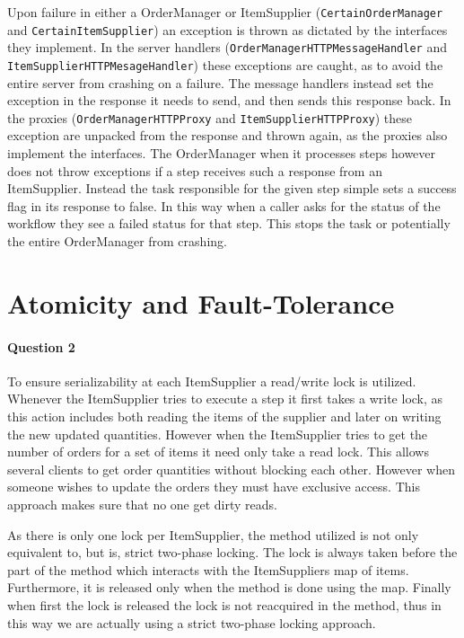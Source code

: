 \documentclass[a4paper, 11pt]{article}
\begin{document}
Upon failure in either a OrderManager or ItemSupplier (\texttt{CertainOrder\-Manager} and \texttt{CertainItemSupplier}) an exception is thrown as dictated by the interfaces they implement. In the server handlers (\texttt{Order\-ManagerHTTPMessageHandler} and \texttt{ItemSupplierHTTPMesageHandler}) these exceptions are caught, as to avoid the entire server from crashing on a failure. The message handlers instead set the exception in the response it needs to send, and then sends this response back. In the proxies (\texttt{OrderManagerHTTPProxy} and \texttt{ItemSupplierHTTPProxy}) these exception are unpacked from the response and thrown again, as the proxies also implement the interfaces. The OrderManager when it processes steps however does not throw exceptions if a step receives such a response from an ItemSupplier. Instead the task responsible for the given step simple sets a success flag in its response to false. In this way when a caller asks for the status of the workflow they see a failed status for that step. This stops the task or potentially the entire OrderManager from crashing.



\section{Atomicity and Fault-Tolerance} %
\label{sec:atomicity_and_fault_tolerance}

\paragraph{Question 2} %
\label{par:question_2}

To ensure serializability at each ItemSupplier a read/write lock is utilized. Whenever the ItemSupplier tries to execute a step it first takes a write lock, as this action includes both reading the items of the supplier and later on writing the new updated quantities. However when the ItemSupplier tries to get the number of orders for a set of items it need only take a read lock. This allows several clients to get order quantities without blocking each other. However when someone wishes to update the orders they must have exclusive access. This approach makes sure that no one get dirty reads.

As there is only one lock per ItemSupplier, the method utilized is not only equivalent to, but is, strict two-phase locking. The lock is always taken before the part of the method which interacts with the ItemSuppliers map of items. Furthermore, it is released only when the method is done using the map. Finally when first the lock is released the lock is not reacquired in the method, thus in this way we are actually using a strict two-phase locking approach.
\end{document}
